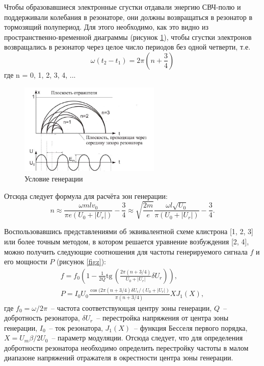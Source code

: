 \documentclass[a4paper,14pt]{extarticle}
\renewcommand{\tan}{\mathrm{tg\,}}
\begin{document}
	Чтобы  образовавшиеся  электронные  сгустки  отдавали  энергию  СВЧ-полю и поддерживали колебания в резонаторе, они должны возвращаться в резонатор в тормозящий полупериод. Для этого необходимо, как это видно из пространственно-временной диаграммы (рисунок \ref{cond}),  чтобы  сгустки  электронов  возвращались  в  резонатор  через целое число периодов без одной четверти, т.е. 
	$$ \omega (t_2 - t_1) = 2\pi \left(n + \frac{3}{4}\right)$$
	где n = 0, 1, 2, 3, 4, ... 
	
	\begin{figure}[h]
		\center
		\includegraphics[width = 0.6\textwidth]{images/12.png}
		\caption{Условие генерации}
		\label{cond}
	\end{figure}
	
	Отсюда следует формула для расчёта зон генерации:
	\begin{equation}
	n \approx \frac{\omega mlv_0}{\pi e(U_0 + |U_r|)} - \frac{3}{4} \approx \sqrt{\frac{2m}{e}}\frac{\omega l\sqrt{U_0}}{\pi (U_0 + |U_r|)} - \frac{3}{4}.
    \label{eq:n}
	\end{equation}
	
	Воспользовавшись представлениями об эквивалентной схеме клистрона [1, 2, 3] или более точным методом, в котором решается уравнение возбуждения [2, 4], можно получить следующие соотношения для частоты генерируемого сигнала $f$ и его мощности $P$ (рисунок \ref{figz}):
	\begin{gather}
	f = f_0 \left(1 - \frac{1}{2Q} \tan \left( \frac{2\pi(n + 3/4)}{U_0 + |U_r|} \delta U_r \right)\right), \label{eq:Q}\\
	P = I_0 U_0 \frac{\cos (2\pi (n + 3/4)\delta U_r/(U_0 + |U_r|)}{\pi (n + 3/4)} X J_1(X),
	\end{gather}
	где $f_0 = \omega/2\pi$~-- частота соответствующая центру зоны генерации, $Q$~-- добротность резонатора, $\delta U_r$~-- перестройка напряжения от центра зоны генерации, $I_0$~-- ток резонатора, $J_1(X)$~-- функция Бесселя первого порядка, $X = U_m\beta/2U_0$~-- параметр модуляции. Отсюда следует, что для определения добротности резонатора необходимо определить перестройку частоты в малом диапазоне напряжений отражателя в окрестности центра зоны генерации.
	
\end{document}
